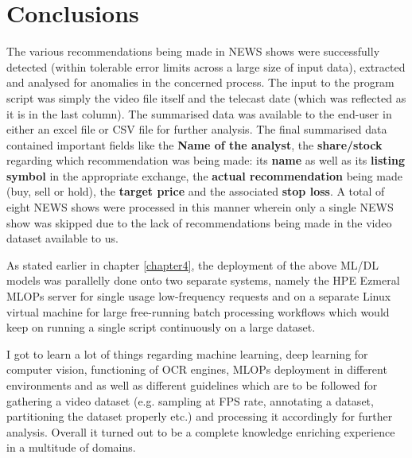 \chapter{Conclusions} \label{chapter6}

The various recommendations being made in NEWS shows were successfully detected (within tolerable error limits across a large size of input data), extracted and analysed for anomalies in the concerned process.  The input to the program script was simply the video file itself and the telecast date (which was reflected as it is in the last column). The summarised data was available to the end-user in either an excel file or CSV file for further analysis. The final summarised data contained important fields like the \textbf{Name of the analyst}, the \textbf{share/stock} regarding which recommendation was being made: its \textbf{name} as well as its \textbf{listing symbol} in the appropriate exchange, the \textbf{actual recommendation} being made (buy, sell or hold), the \textbf{target price} and the associated \textbf{stop loss}.  A total of eight NEWS shows were processed in this manner wherein only a single NEWS show was skipped due to the lack of recommendations being made in the video dataset available to us. \par

As stated earlier in chapter \ref{chapter4}, the deployment of the above ML/DL models was parallelly done onto two separate systems, namely the HPE Ezmeral MLOPs server for single usage low-frequency requests and on a separate Linux virtual machine for large free-running batch processing workflows which would keep on running a single script continuously on a large dataset. \par

I got to learn a lot of things regarding machine learning, deep learning for computer vision, functioning of OCR engines, MLOPs deployment in different environments and as well as different guidelines which are to be followed for gathering a video dataset (e.g. sampling at FPS rate, annotating a dataset, partitioning the dataset properly etc.) and processing it accordingly for further analysis. Overall it turned out to be a complete knowledge enriching experience in a multitude of domains.
